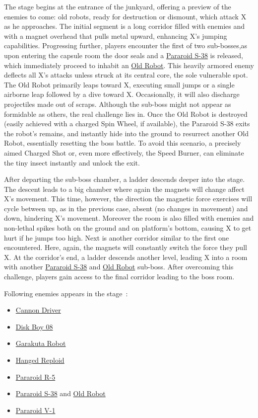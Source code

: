 The stage begins at the entrance of the junkyard, offering a preview of the enemies to come: old robots, ready for destruction or dismount, which attack X as he approaches. The initial segment is a long corridor filled with enemies and with a magnet overhead that pulls metal upward, enhancing X's jumping capabilities. Progressing further, players encounter the first of two sub-bosses,as upon entering the capsule room the door seals and a \hyperlink{miniboss:Pararoid_S-38}{Pararoid S-38} is released, which immediately proceed to inhabit an \hyperlink{miniboss:Old_robot}{Old Robot}. This heavily armored enemy deflects all X's attacks unless struck at its central core, the sole vulnerable spot. The Old Robot primarily leaps toward X, executing small jumps or a single airborne leap followed by a dive toward X. Occasionally, it will also discharge projectiles made out of scraps. Although the sub-boss might not appear as formidable as others, the real challenge lies in. Once the Old Robot is destroyed (easily achieved with a charged Spin Wheel, if available), the Pararoid S-38 exits the robot's remains, and instantly hide into the ground to resurrect another Old Robot, essentially resetting the boss battle. To avoid this scenario, a precisely aimed Charged Shot or, even more effectively, the Speed Burner, can eliminate the tiny insect instantly and unlock the exit.

After departing the sub-boss chamber, a ladder descends deeper into the stage. The descent leads to a big chamber where again the magnets will change affect X's movement. This time, however, the direction the magnetic force exercises will cycle between up, as in the previous case, absent (no changes in movement) and down, hindering X's movement. Moreover the room is also filled with enemies and non-lethal spikes both on the ground and on platform's bottom, causing X to get hurt if he jumps too high. Next is another corridor similar to the first one encountered. Here, again, the magnets will constantly switch the force they pull X. At the corridor's end, a ladder descends another level, leading X into a room with another \hyperlink{miniboss:Pararoid_S-38}{Pararoid S-38} and \hyperlink{miniboss:Old_robot}{Old Robot} sub-boss. After overcoming this challenge, players gain access to the final corridor leading to the boss room.

Following enemies appears in the stage~\cite{wiki:Robot_Junkyard}:
\begin{itemize}
	
	\item \hyperlink {enem:Cannon_Driver}{Cannon Driver}
	\item \hyperlink {enem:Disk_Boy_08}{Disk Boy 08}
	\item \hyperlink {enem:Garakuta_Robot}{Garakuta Robot} 
	\item \hyperlink {enem:Hanged_Reploid}{Hanged Reploid}
	\item \hyperlink {enem:Pararoid_R-5}{Pararoid R-5}
	\item \hyperlink {miniboss:Pararoid_S-38}{Pararoid S-38} and \hyperlink{miniboss:Old_robot}{Old Robot}
	\item \hyperlink {enem:Pararoid_V-1}{Pararoid V-1}
\end{itemize}


